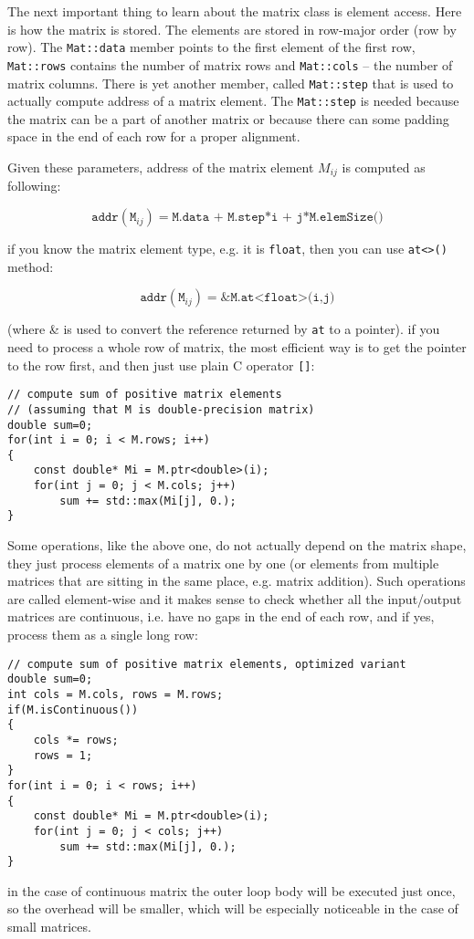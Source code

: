 The next important thing to learn about the matrix class is element access. Here is how the matrix is stored. The elements are stored in row-major order (row by row). The \texttt{Mat::data} member points to the first element of the first row, \texttt{Mat::rows} contains the number of matrix rows and \texttt{Mat::cols} -- the number of matrix columns. There is yet another member, called \texttt{Mat::step} that is used to actually compute address of a matrix element. The \texttt{Mat::step} is needed because the matrix can be a part of another matrix or because there can some padding space in the end of each row for a proper alignment.

Given these parameters, address of the matrix element $M_{ij}$ is computed as following:

\[
\texttt{addr}(\texttt{M}_{ij})=\texttt{M.data + M.step*i + j*M.elemSize()}
\]

if you know the matrix element type, e.g. it is \texttt{float}, then you can use \texttt{at<>()} method:

\[
\texttt{addr}(\texttt{M}_{ij})=\&\texttt{M.at<float>(i,j)}
\]

(where \& is used to convert the reference returned by \texttt{at} to a pointer).
if you need to process a whole row of matrix, the most efficient way is to get the pointer to the row first, and then just use plain C operator \texttt{[]}:

\begin{lstlisting}
// compute sum of positive matrix elements
// (assuming that M is double-precision matrix)
double sum=0;
for(int i = 0; i < M.rows; i++)
{
    const double* Mi = M.ptr<double>(i);
    for(int j = 0; j < M.cols; j++)
        sum += std::max(Mi[j], 0.);
}
\end{lstlisting}

Some operations, like the above one, do not actually depend on the matrix shape, they just process elements of a matrix one by one (or elements from multiple matrices that are sitting in the same place, e.g. matrix addition). Such operations are called element-wise and it makes sense to check whether all the input/output matrices are continuous, i.e. have no gaps in the end of each row, and if yes, process them as a single long row:

\begin{lstlisting}
// compute sum of positive matrix elements, optimized variant
double sum=0;
int cols = M.cols, rows = M.rows;
if(M.isContinuous())
{
    cols *= rows;
    rows = 1;
}
for(int i = 0; i < rows; i++)
{
    const double* Mi = M.ptr<double>(i);
    for(int j = 0; j < cols; j++)
        sum += std::max(Mi[j], 0.);
}
\end{lstlisting}
in the case of continuous matrix the outer loop body will be executed just once, so the overhead will be smaller, which will be especially noticeable in the case of small matrices.

